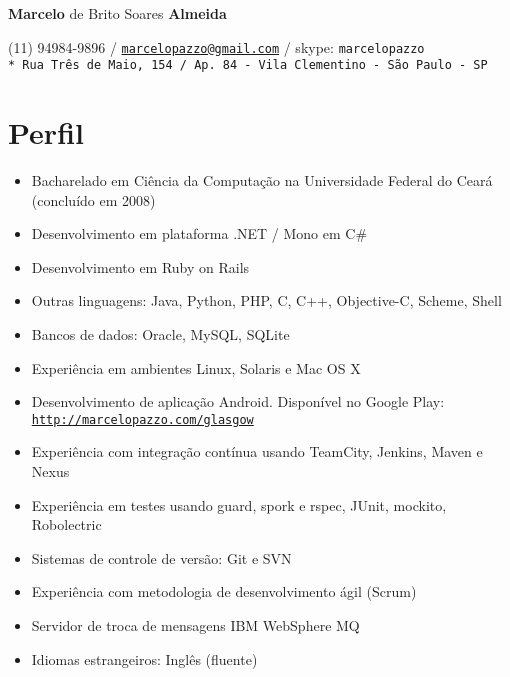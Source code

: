 \documentclass[11pt]{article}
\def\name{\textbf{Marcelo} de Brito Soares \textbf{Almeida}}
\begin{document}
\begin{flushright}

{\huge \name}

\vspace{0.05in}
(11) 94984-9896 / \href{mailto:marcelopazzo@gmail.com}{\tt marcelopazzo@gmail.com} / skype: \tt marcelopazzo
\vspace{0.01in} \\* 
Rua Três de Maio, 154 / Ap. 84 - Vila Clementino - São Paulo - SP

\end{flushright}

\section*{Perfil}
\begin{itemize}
  \item Bacharelado em Ciência da Computação na Universidade Federal do Ceará (concluído em 2008)
  \item Desenvolvimento em plataforma .NET / Mono em C\#
  \item Desenvolvimento em Ruby on Rails
  \item Outras linguagens: Java, Python, PHP, C, C++, Objective-C, Scheme, Shell
  \item Bancos de dados: Oracle, MySQL, SQLite
  \item Experiência em ambientes Linux, Solaris e Mac OS X
  \item Desenvolvimento de aplicação Android. Disponível no Google Play:
            \href{http://marcelopazzo.com/glasgow}{\tt http://marcelopazzo.com/glasgow}
  \item Experiência com integração contínua usando TeamCity, Jenkins, Maven e Nexus
  \item Experiência em testes usando guard, spork e rspec, JUnit, mockito, Robolectric
  \item Sistemas de controle de versão: Git e SVN
  \item Experiência com metodologia de desenvolvimento ágil (Scrum)
  \item Servidor de troca de mensagens IBM WebSphere MQ
  \item Idiomas estrangeiros: Inglês (fluente)
\end{itemize}
\end{document}
